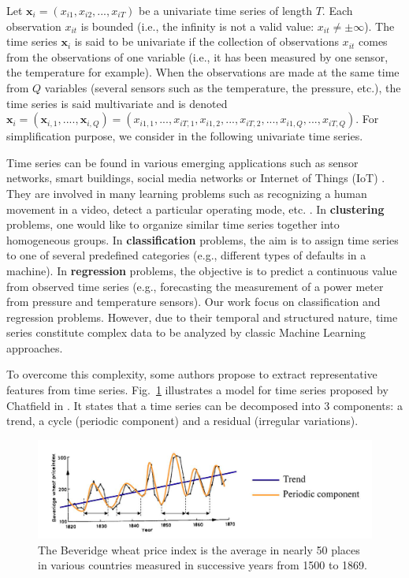 Let $\textbf{x}_i=(x_{i1}, x_{i2}, ..., x_{iT})$ be a univariate time series of length $T$. Each observation $x_{it}$ is bounded (i.e., the infinity is not a valid value: $x_{it} \neq \pm \infty$). The time series $\textbf{x}_i$ is said to be univariate if the collection of observations $x_{it}$ comes from the observations of one variable (i.e., it has been measured by one sensor, the temperature for example). When the observations are made at the same time from $Q$ variables (several sensors such as the temperature, the pressure, etc.), the time series is said multivariate and is denoted $\textbf{x}_i=(\textbf{x}_{i,1}, ...., \textbf{x}_{i,Q})=(x_{i1,1}, ..., x_{iT,1},x_{i1,2}, ..., x_{iT,2}, ..., x_{i1,Q}, ..., x_{iT,Q})$. For simplification purpose, we consider in the following univariate time series. 

Time series can be found in various emerging applications such as sensor networks, smart buildings, social media networks or Internet of Things (IoT) \cite{Najmeddine2012,Nguyen2012,Yin2008}. They are involved in many learning problems such as recognizing a human movement in a video, detect a particular operating mode, etc. \cite{PANAGIOTAKIS2008,Ramasso2008}. In \textbf{clustering} problems, one would like to organize similar time series together into homogeneous groups. In \textbf{classification} problems, the aim is to assign time series to one of several predefined categories (e.g., different types of defaults in a machine). In \textbf{regression} problems, the objective is to predict a continuous value from observed time series (e.g., forecasting the measurement of a power meter from pressure and temperature sensors). Our work focus on classification and regression problems. However, due to their temporal and structured nature, time series constitute complex data to be analyzed by classic Machine Learning approaches.

To overcome this complexity, some authors propose to extract representative features from time series. Fig.~\ref{fig:time_series_example} illustrates a model for time series proposed by Chatfield in \cite{Chatfield2004}. It states that a time series can be decomposed into 3 components: a trend, a cycle (periodic component) and a residual (irregular variations). 

\begin{figure}[h!]
\centering
\includegraphics[width=0.9\linewidth]{images/time_series_example}
\caption{The Beveridge wheat price index is the average in nearly 50 places in various countries measured in successive years from 1500 to 1869. \protect\footnotemark}
\label{fig:time_series_example}
\end{figure}

